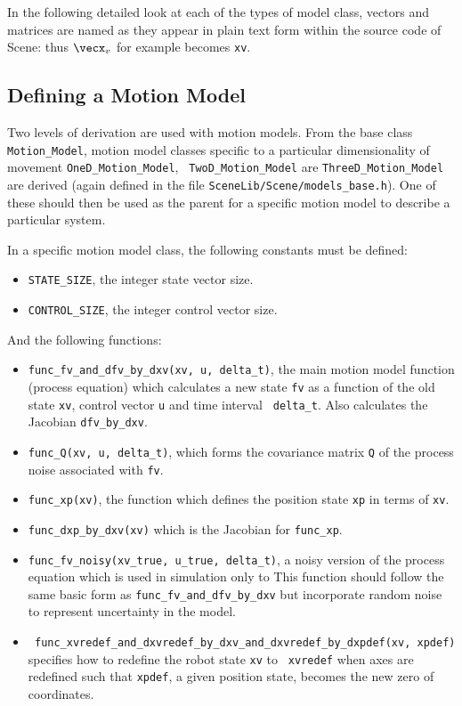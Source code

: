 \documentclass{article}
\begin{document}
In the following detailed look at each of the types of model class,
vectors and matrices are named as they appear in plain text form
within the source code of Scene: thus $\vecx_v$ for example becomes
{\tt xv}.

\subsection{Defining a Motion Model}

Two levels of derivation are used with motion models. From the base
class {\tt Motion\_Model}, motion model classes specific to a
particular dimensionality of movement {\tt OneD\_Motion\_Model}, {\tt
  TwoD\_Motion\_Model} are {\tt ThreeD\_Motion\_Model} are derived
(again defined in the file {\tt SceneLib/Scene/models\_base.h}). One
of these should then be used as the parent for a specific motion model
to describe a particular system.

In a specific motion model class, the following constants must be
defined:

\begin{itemize}
\item {\tt STATE\_SIZE}, the integer state vector size.
\item {\tt CONTROL\_SIZE}, the integer control vector size.
\end{itemize}

And the following functions: 
\begin{itemize}
\item {\tt func\_fv\_and\_dfv\_by\_dxv(xv, u, delta\_t)}, the main motion
  model function (process equation) which calculates a new state {\tt fv} as a function of the old
  state {\tt xv}, control vector {\tt u} and time interval {\tt
    delta\_t}. Also calculates the Jacobian {\tt dfv\_by\_dxv}.
\item {\tt func\_Q(xv, u, delta\_t)}, which forms the covariance
  matrix {\tt Q} of the process noise associated with {\tt fv}.
\item {\tt func\_xp(xv)}, the function which defines the position
  state {\tt xp} in terms of {\tt xv}.
\item {\tt func\_dxp\_by\_dxv(xv)} which is the Jacobian for {\tt func\_xp}.
\item {\tt func\_fv\_noisy(xv\_true, u\_true, delta\_t)}, a noisy
  version of the process equation which is used in simulation only to 
  This function should follow the same basic form as
  {\tt func\_fv\_and\_dfv\_by\_dxv} but incorporate random noise to represent
  uncertainty in the model.
\item {\tt
    func\_xvredef\_and\_dxvredef\_by\_dxv\_and\_dxvredef\_by\_dxpdef(xv,
    xpdef)} specifies how to redefine the robot state {\tt xv} to {\tt
    xvredef} when axes are redefined such that {\tt xpdef}, a given
  position state, becomes the new zero of coordinates.
\end{itemize}
\end{document}
